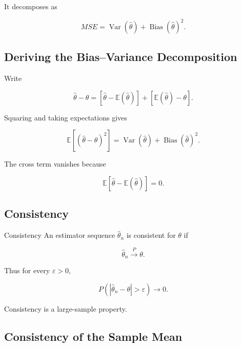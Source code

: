 It decomposes as

\[
\boxed{
MSE
=
\operatorname{Var}
(
\widehat{\theta}
)
+
\operatorname{Bias}
(
\widehat{\theta}
)^2.
}
\]

\subsection{Deriving the Bias--Variance Decomposition}
\label{subsec:bias-variance-decomposition}

Write

\[
\widehat{\theta}-\theta
=
\left[
\widehat{\theta}
-
\mathbb{E}(\widehat{\theta})
\right]
+
\left[
\mathbb{E}(\widehat{\theta})
-
\theta
\right].
\]

Squaring and taking expectations gives

\[
\boxed{
\mathbb{E}
[
(
\widehat{\theta}-\theta
)^2
]
=
\operatorname{Var}(\widehat{\theta})
+
\operatorname{Bias}(\widehat{\theta})^2.
}
\]

The cross term vanishes because

\[
\mathbb{E}
[
\widehat{\theta}
-
\mathbb{E}(\widehat{\theta})
]
=
0.
\]

\subsection{Consistency}
\label{subsec:estimator-consistency}

\begin{definitionbox}{Consistency}
An estimator sequence \(\widehat{\theta}_n\) is consistent for
\(\theta\) if

\[
\boxed{
\widehat{\theta}_n
\xrightarrow{P}
\theta.
}
\]
\end{definitionbox}

Thus for every \(\varepsilon>0\),

\[
\boxed{
P
(
|
\widehat{\theta}_n-\theta
|>\varepsilon
)
\to0.
}
\]

Consistency is a large-sample property.

\subsection{Consistency of the Sample Mean}
\label{subsec:consistency-sample-mean}

